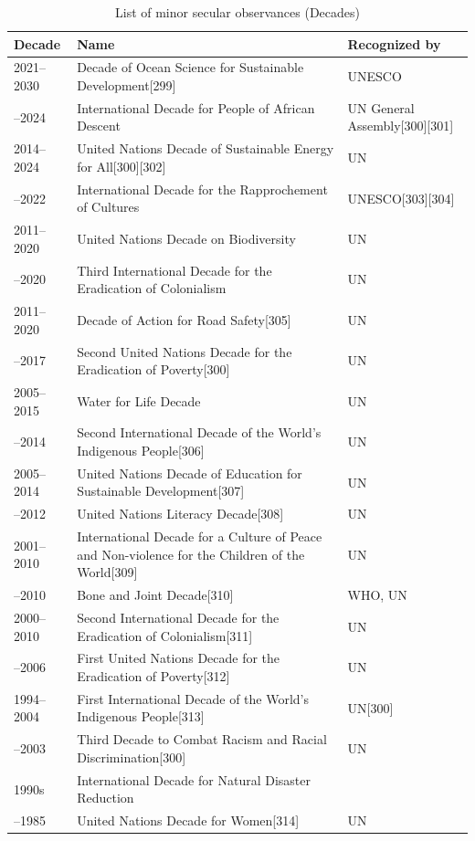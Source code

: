 \documentclass[
  openany]{book}
\begin{document}
\begin{longtable}[t]{>{\raggedright\arraybackslash}p{8em}>{\raggedright\arraybackslash}p{20em}>{\raggedright\arraybackslash}p{12em}}
\caption{\label{tab:international-decades}List of minor secular observances (Decades)}\\
\toprule
Decade & Name & Recognized by\\
\midrule
\rowcolor{gray!6}  2021–2030 & Decade of Ocean Science for Sustainable Development[299] & UNESCO\\
2015–2024 & International Decade for People of African Descent & UN General Assembly[300][301]\\
\rowcolor{gray!6}  2014–2024 & United Nations Decade of Sustainable Energy for All[300][302] & UN\\
2013–2022 & International Decade for the Rapprochement of Cultures & UNESCO[303][304]\\
\rowcolor{gray!6}  2011–2020 & United Nations Decade on Biodiversity & UN\\
\addlinespace
2011–2020 & Third International Decade for the Eradication of Colonialism & UN\\
\rowcolor{gray!6}  2011–2020 & Decade of Action for Road Safety[305] & UN\\
2008–2017 & Second United Nations Decade for the Eradication of Poverty[300] & UN\\
\rowcolor{gray!6}  2005–2015 & Water for Life Decade & UN\\
2005–2014 & Second International Decade of the World's Indigenous People[306] & UN\\
\addlinespace
\rowcolor{gray!6}  2005–2014 & United Nations Decade of Education for Sustainable Development[307] & UN\\
2003–2012 & United Nations Literacy Decade[308] & UN\\
\rowcolor{gray!6}  2001–2010 & International Decade for a Culture of Peace and Non-violence for the Children of the World[309] & UN\\
2000–2010 & Bone and Joint Decade[310] & WHO, UN\\
\rowcolor{gray!6}  2000–2010 & Second International Decade for the Eradication of Colonialism[311] & UN\\
\addlinespace
1997–2006 & First United Nations Decade for the Eradication of Poverty[312] & UN\\
\rowcolor{gray!6}  1994–2004 & First International Decade of the World's Indigenous People[313] & UN[300]\\
1993–2003 & Third Decade to Combat Racism and Racial Discrimination[300] & UN\\
\rowcolor{gray!6}  1990s & International Decade for Natural Disaster Reduction & \\
1976–1985 & United Nations Decade for Women[314] & UN\\
\bottomrule
\end{longtable}
\end{document}
